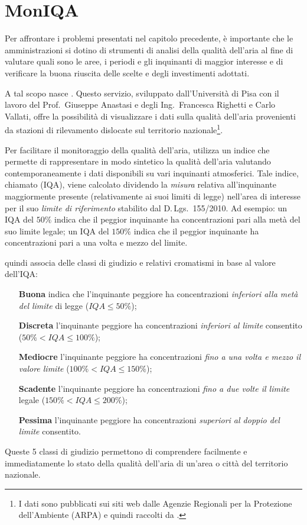 \section{MonIQA}

Per affrontare i problemi presentati nel capitolo precedente, è importante che
le amministrazioni si dotino di strumenti di analisi della qualità dell'aria al
fine di valutare quali sono le aree, i periodi e gli inquinanti di maggior
interesse e di verificare la buona riuscita delle scelte e degli investimenti
adottati.

A tal scopo nasce \MonIQA\@. Questo servizio, sviluppato dall'Università di Pisa
con il lavoro del Prof.\ Giuseppe Anastasi e degli Ing.\ Francesca Righetti e
Carlo Vallati, offre la possibilità di visualizzare i dati sulla qualità
dell'aria provenienti da stazioni di rilevamento dislocate sul territorio
nazionale\footnote{I dati sono pubblicati sui siti web dalle Agenzie Regionali
per la Protezione dell'Ambiente (ARPA) e quindi raccolti da \MonIQA\@.}.

Per facilitare il monitoraggio della qualità dell'aria, \MonIQA{} utilizza un
indice che permette di rappresentare in modo sintetico la qualità dell'aria
valutando contemporaneamente i dati disponibili su vari inquinanti atmosferici.
Tale indice, chiamato  (IQA), viene
calcolato dividendo la \emph{misura} relativa all'inquinante maggiormente
presente (relativamente ai suoi limiti di legge) nell'area di interesse per il
suo \emph{limite di riferimento} stabilito dal \mbox{D.\,Lgs.}~155/2010. Ad
esempio: un IQA del \(50\%\) indica che il peggior inquinante ha concentrazioni
pari alla metà del suo limite legale; un IQA del \(150\%\) indica che il peggior
inquinante ha concentrazioni pari a una volta e mezzo del limite.

\MonIQA{} quindi associa delle classi di giudizio e relativi cromatismi in base
al valore dell'IQA:
\begin{itemize}
	\item [\textbf{Buona} \colorbullet{goodiqa}] indica che l'inquinante
		peggiore ha concentrazioni \emph{inferiori alla metà del limite}
		di legge (\(IQA \leq 50\%\));
	\item [\textbf{Discreta} \colorbullet{reasonableiqa}] l'inquinante
		peggiore ha concentrazioni \emph{inferiori al limite} consentito
		(\(50\% < IQA \leq 100\%\));
	\item [\textbf{Mediocre} \colorbullet{mediocreiqa}] l'inquinante
		peggiore ha concentrazioni \emph{fino a una volta e mezzo il
		valore limite} (\(100\% < IQA \leq 150\%\));
	\item [\textbf{Scadente} \colorbullet{pooriqa}] l'inquinante peggiore ha
		concentrazioni \emph{fino a due volte il limite} legale (\(150\%
		< IQA \leq 200\%\));
	\item [\textbf{Pessima} \colorbullet{badiqa}] l'inquinante peggiore ha
		concentrazioni \emph{superiori al doppio del limite} consentito.
\end{itemize}
Queste 5 classi di giudizio permettono di comprendere facilmente e
immediatamente lo stato della qualità dell'aria di un'area o città del
territorio nazionale.

